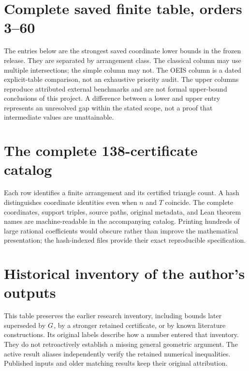 \section{Complete saved finite table, orders 3--60}\label{app:finite-table}

The entries below are the strongest saved coordinate lower bounds in the frozen release. They are separated by arrangement class. The classical column may use multiple intersections; the simple column may not. The OEIS column is a dated explicit-table comparison, not an exhaustive priority audit. The upper columns reproduce attributed external benchmarks and are not formal upper-bound conclusions of this project. A difference between a lower and upper entry represents an unresolved gap within the stated scope, not a proof that intermediate values are unattainable.



\section{The complete 138-certificate catalog}\label{app:catalog}

Each row identifies a finite arrangement and its certified triangle count. A hash distinguishes coordinate identities even when $n$ and $T$ coincide. The complete coordinates, support triples, source paths, original metadata, and Lean theorem names are machine-readable in the accompanying catalog. Printing hundreds of large rational coefficients would obscure rather than improve the mathematical presentation; the hash-indexed files provide their exact reproducible specification.



\section{Historical inventory of the author's outputs}\label{app:historical}

This table preserves the earlier research inventory, including bounds later superseded by $G$, by a stronger retained certificate, or by known literature constructions. Its original labels describe how a number entered that inventory. They do not retroactively establish a missing general geometric argument. The active result aliases independently verify the retained numerical inequalities. Published inputs and older matching results keep their original attribution.

